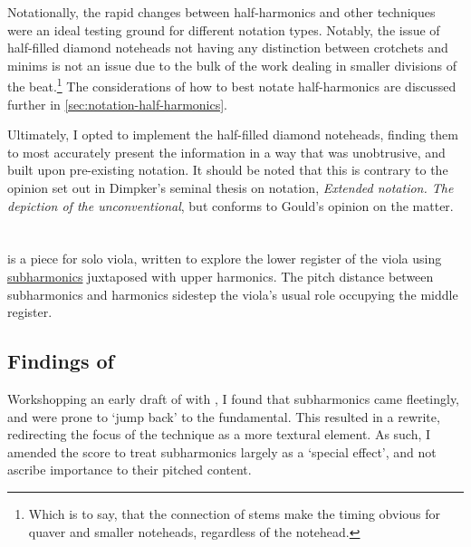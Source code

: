 Notationally, the rapid changes between half-harmonics and other techniques were an ideal testing ground for different notation types.
Notably, the issue of half-filled diamond noteheads not having any distinction between crotchets and minims is not an issue due to the bulk of the work dealing in smaller divisions of the beat.\footnote{Which is to say, that the connection of stems make the timing obvious for quaver and smaller noteheads, regardless of the notehead.}
The considerations of how to best notate half-harmonics are discussed further in \autoref{sec:notation-half-harmonics}.

Ultimately, I opted to implement the half-filled diamond noteheads, finding them to most accurately present the information in a way that was unobtrusive, and built upon pre-existing notation.
It should be noted that this is contrary to the opinion set out in Dimpker's seminal thesis on notation, \emph{Extended notation. The depiction of the
unconventional}, but conforms to Gould's opinion on the matter.\autocites[120--121]{dimpkerExtendedNotationDepiction2012}[61]{gouldBars2011}


\section{\violaPiece}\label{sec:violaPiece}
\violaPiece\space is a piece for solo viola, written to explore the lower register of the viola using \hyperref[sec:subharmonicsDiscussion]{subharmonics} juxtaposed with upper harmonics. 
The pitch distance between subharmonics and harmonics sidestep the viola's usual role occupying the middle register.



\subsection{Findings of \violaPiece}

Workshopping an early draft of \violaPiece\space with \violaParticipant, I found that subharmonics came fleetingly, and were prone to `jump back' to the fundamental.\autocite[]{appleseedFeedbackExploratorySession2019}
This resulted in a rewrite, redirecting the focus of the technique as a more textural element. 
As such, I amended the score to treat subharmonics largely as a `special effect', and not ascribe importance to their pitched content.

